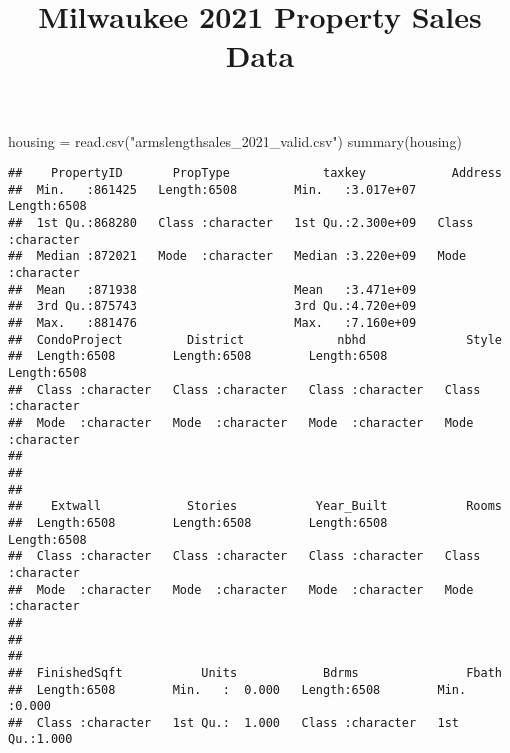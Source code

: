 \documentclass[
]{article}
\title{Milwaukee 2021 Property Sales Data}
\author{}
\date{\vspace{-2.5em}}
\newenvironment{Shaded}{\begin{snugshade}}{\end{snugshade}}
\newcommand{\FunctionTok}[1]{\textcolor[rgb]{0.00,0.00,0.00}{#1}}
\newcommand{\NormalTok}[1]{#1}
\newcommand{\OtherTok}[1]{\textcolor[rgb]{0.56,0.35,0.01}{#1}}
\newcommand{\StringTok}[1]{\textcolor[rgb]{0.31,0.60,0.02}{#1}}
\begin{document}
\maketitle

\begin{Shaded}
\begin{Highlighting}[]
\NormalTok{housing }\OtherTok{=} \FunctionTok{read.csv}\NormalTok{(}\StringTok{"armslengthsales\_2021\_valid.csv"}\NormalTok{)}
\FunctionTok{summary}\NormalTok{(housing)}
\end{Highlighting}
\end{Shaded}

\begin{verbatim}
##    PropertyID       PropType             taxkey            Address         
##  Min.   :861425   Length:6508        Min.   :3.017e+07   Length:6508       
##  1st Qu.:868280   Class :character   1st Qu.:2.300e+09   Class :character  
##  Median :872021   Mode  :character   Median :3.220e+09   Mode  :character  
##  Mean   :871938                      Mean   :3.471e+09                     
##  3rd Qu.:875743                      3rd Qu.:4.720e+09                     
##  Max.   :881476                      Max.   :7.160e+09                     
##  CondoProject         District             nbhd              Style          
##  Length:6508        Length:6508        Length:6508        Length:6508       
##  Class :character   Class :character   Class :character   Class :character  
##  Mode  :character   Mode  :character   Mode  :character   Mode  :character  
##                                                                             
##                                                                             
##                                                                             
##    Extwall            Stories           Year_Built           Rooms          
##  Length:6508        Length:6508        Length:6508        Length:6508       
##  Class :character   Class :character   Class :character   Class :character  
##  Mode  :character   Mode  :character   Mode  :character   Mode  :character  
##                                                                             
##                                                                             
##                                                                             
##  FinishedSqft           Units            Bdrms               Fbath      
##  Length:6508        Min.   :  0.000   Length:6508        Min.   :0.000  
##  Class :character   1st Qu.:  1.000   Class :character   1st Qu.:1.000  

\end{verbatim}
\end{document}
